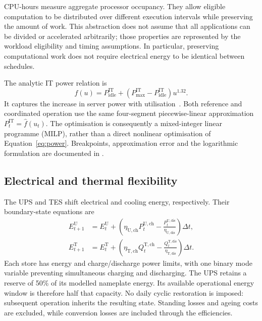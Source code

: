 CPU-hours measure aggregate processor occupancy. They allow eligible computation to be distributed over different execution intervals while preserving the amount of work. This abstraction does not assume that all applications can be divided or accelerated arbitrarily; those properties are represented by the workload eligibility and timing assumptions. In particular, preserving computational work does not require electrical energy to be identical between schedules.

The analytic IT power relation is
\begin{equation}
f(u)=P^{\mathrm{IT}}_{\mathrm{idle}}+
(P^{\mathrm{IT}}_{\max}-P^{\mathrm{IT}}_{\mathrm{idle}})u^{1.32}.
\label{eq:power}
\end{equation}
It captures the increase in server power with utilisation~\cite{dayarathna2015data,v2015analysis}. Both reference and coordinated operation use the same four-segment piecewise-linear approximation $P_t^{\mathrm{IT}}=\widehat f(u_t)$. The optimisation is consequently a mixed-integer linear programme (MILP), rather than a direct nonlinear optimisation of Equation~\eqref{eq:power}. Breakpoints, approximation error and the logarithmic formulation are documented in .

\subsection{Electrical and thermal flexibility}
The UPS and TES shift electrical and cooling energy, respectively. Their boundary-state equations are
\begin{equation}
\begin{aligned}
E^{\mathrm{U}}_{t+1}&=E^{\mathrm{U}}_t+
\left(\eta_{\mathrm{U,ch}}P_t^{\mathrm{U,ch}}-
\frac{P_t^{\mathrm{U,dis}}}{\eta_{\mathrm{U,dis}}}\right)\Delta t,\\
E^{\mathrm{T}}_{t+1}&=E^{\mathrm{T}}_t+
\left(\eta_{\mathrm{T,ch}}Q_t^{\mathrm{T,ch}}-
\frac{Q_t^{\mathrm{T,dis}}}{\eta_{\mathrm{T,dis}}}\right)\Delta t.
\end{aligned}
\label{eq:stores}
\end{equation}
Each store has energy and charge/discharge power limits, with one binary mode variable preventing simultaneous charging and discharging. The UPS retains a reserve of 50\% of its modelled nameplate energy. Its available operational energy window is therefore half that capacity. No daily cyclic restoration is imposed: subsequent operation inherits the resulting state. Standing losses and ageing costs are excluded, while conversion losses are included through the efficiencies.

